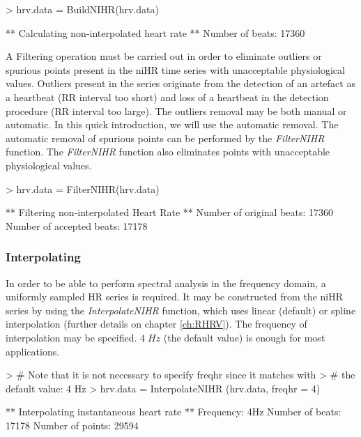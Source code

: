 \documentclass[12pt,lot, lof]{puthesis}
\begin{document}
\begin{Schunk}
\begin{Sinput}
> hrv.data = BuildNIHR(hrv.data)
\end{Sinput}
\begin{Soutput}
** Calculating non-interpolated heart rate **
   Number of beats: 17360 
\end{Soutput}
\end{Schunk}

A Filtering operation must be carried out in order to eliminate outliers or 
spurious points present in the \gls{niHR} time series with
unacceptable physiological values. Outliers present in the series originate 
from the detection of an artefact as a heartbeat (RR interval too short) and 
loss of a heartbeat in the detection procedure (RR interval too large). The 
outliers removal may be both manual or automatic. In this quick introduction, 
we will use the automatic removal.  The automatic removal of spurious points 
can be performed by the \textit{FilterNIHR} function. The \textit{FilterNIHR} 
function also eliminates points with unacceptable physiological values.\\
\begin{Schunk}
\begin{Sinput}
> hrv.data = FilterNIHR(hrv.data)
\end{Sinput}
\begin{Soutput}
** Filtering non-interpolated Heart Rate **
   Number of original beats: 17360 
   Number of accepted beats: 17178 
\end{Soutput}
\end{Schunk}
\subsubsection{Interpolating} In order to be able to perform spectral analysis 
in the frequency domain, a uniformly sampled \gls{HR} series is required. It 
may be constructed from the \gls{niHR} series by using the 
\textit{InterpolateNIHR} function, which uses linear (default) or spline 
interpolation  (further details
on chapter \ref{ch:RHRV}). The frequency of interpolation may be specified. 
$4\;Hz $ (the default value) is  enough for most applications.

\begin{Schunk}
\begin{Sinput}
> # Note that it is not necessary to specify freqhr since it matches with
> # the default value: 4 Hz
> hrv.data = InterpolateNIHR (hrv.data, freqhr = 4)
\end{Sinput}
\begin{Soutput}
** Interpolating instantaneous heart rate **
   Frequency: 4Hz
   Number of beats: 17178 
   Number of points: 29594 
\end{Soutput}
\end{Schunk}
\end{document}

